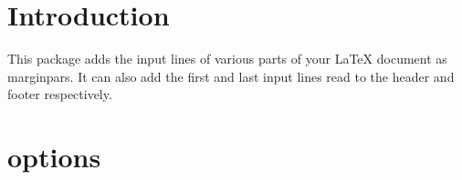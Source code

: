 \documentclass{scrartcl}
\begin{document}
\section{Introduction}
This package adds the input lines of various parts of your LaTeX
document as marginpars.
It can also add the first and last input lines read to the header and
footer respectively.

\section{options}
\end{document}
